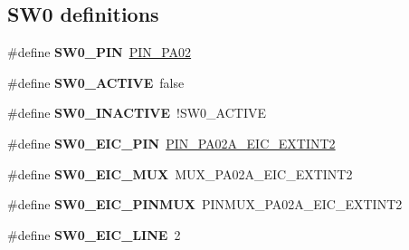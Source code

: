 \subsection*{S\+W0 definitions}
\begin{DoxyCompactItemize}
\item 
\hypertarget{group__saml21__xplained__pro__features__group_ga1db7ea1df7a18b3749ee2eaaa2f2d0af}{}\#define {\bfseries S\+W0\+\_\+\+P\+I\+N}~\hyperlink{pio_2saml21j18a_8h_ada4a90557e056a63a5c13b11343471ab}{P\+I\+N\+\_\+\+P\+A02}\label{group__saml21__xplained__pro__features__group_ga1db7ea1df7a18b3749ee2eaaa2f2d0af}

\item 
\hypertarget{group__saml21__xplained__pro__features__group_gac534d0b05a26a80e6e8e83a049b80655}{}\#define {\bfseries S\+W0\+\_\+\+A\+C\+T\+I\+V\+E}~false\label{group__saml21__xplained__pro__features__group_gac534d0b05a26a80e6e8e83a049b80655}

\item 
\hypertarget{group__saml21__xplained__pro__features__group_ga74eeefc6abe579addaec6ac2bff4d080}{}\#define {\bfseries S\+W0\+\_\+\+I\+N\+A\+C\+T\+I\+V\+E}~!S\+W0\+\_\+\+A\+C\+T\+I\+V\+E\label{group__saml21__xplained__pro__features__group_ga74eeefc6abe579addaec6ac2bff4d080}

\item 
\hypertarget{group__saml21__xplained__pro__features__group_gac9d5ae203ecf805717134dfcee12372b}{}\#define {\bfseries S\+W0\+\_\+\+E\+I\+C\+\_\+\+P\+I\+N}~\hyperlink{pio_2saml21j18a_8h_aea7fe40459b7796f18577ecfc01f8a47}{P\+I\+N\+\_\+\+P\+A02\+A\+\_\+\+E\+I\+C\+\_\+\+E\+X\+T\+I\+N\+T2}\label{group__saml21__xplained__pro__features__group_gac9d5ae203ecf805717134dfcee12372b}

\item 
\hypertarget{group__saml21__xplained__pro__features__group_ga18b3e713457ceaf39e36dbccd8f200fa}{}\#define {\bfseries S\+W0\+\_\+\+E\+I\+C\+\_\+\+M\+U\+X}~M\+U\+X\+\_\+\+P\+A02\+A\+\_\+\+E\+I\+C\+\_\+\+E\+X\+T\+I\+N\+T2\label{group__saml21__xplained__pro__features__group_ga18b3e713457ceaf39e36dbccd8f200fa}

\item 
\hypertarget{group__saml21__xplained__pro__features__group_ga27bc87cdd4caabcd3160ae3a03f297c7}{}\#define {\bfseries S\+W0\+\_\+\+E\+I\+C\+\_\+\+P\+I\+N\+M\+U\+X}~P\+I\+N\+M\+U\+X\+\_\+\+P\+A02\+A\+\_\+\+E\+I\+C\+\_\+\+E\+X\+T\+I\+N\+T2\label{group__saml21__xplained__pro__features__group_ga27bc87cdd4caabcd3160ae3a03f297c7}

\item 
\hypertarget{group__saml21__xplained__pro__features__group_ga202edaf3ad972f409e83a1fab0f19579}{}\#define {\bfseries S\+W0\+\_\+\+E\+I\+C\+\_\+\+L\+I\+N\+E}~2\label{group__saml21__xplained__pro__features__group_ga202edaf3ad972f409e83a1fab0f19579}

\end{DoxyCompactItemize}
